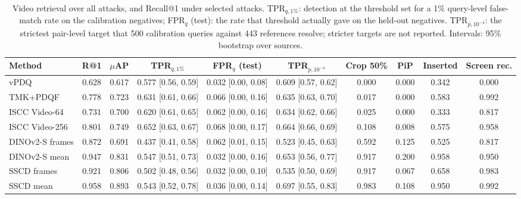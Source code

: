 \begin{table}[!t]
\centering
\scriptsize
\caption{Video retrieval over all attacks, and Recall@1 under selected attacks. TPR$_{q,1\%}$: detection at the threshold set for a 1\% query-level false-match rate on the calibration negatives; FPR$_q$ (test): the rate that threshold actually gave on the held-out negatives. TPR$_{p,10^{-4}}$: the strictest pair-level target that 500 calibration queries against 443 references resolve; stricter targets are not reported. Intervals: 95\% bootstrap over sources.}
\label{tab:video}
\setlength{\tabcolsep}{3pt}
\begin{tabular}{lccccccccc}
\toprule
Method & R@1 & $\mu$AP & TPR$_{q,1\%}$ & FPR$_{q}$ (test) & TPR$_{p,10^{-4}}$ & Crop 50\% & PiP & Inserted & Screen rec. \\
\midrule
vPDQ & 0.628 & 0.617 & 0.577 \tiny[0.56, 0.59] & 0.032 \tiny[0.00, 0.08] & 0.609 \tiny[0.57, 0.62] & 0.000 & 0.000 & 0.342 & 0.000 \\
TMK+PDQF & 0.778 & 0.723 & 0.631 \tiny[0.61, 0.66] & 0.066 \tiny[0.00, 0.16] & 0.635 \tiny[0.63, 0.70] & 0.017 & 0.000 & 0.583 & 0.992 \\
ISCC Video-64 & 0.731 & 0.700 & 0.620 \tiny[0.61, 0.65] & 0.062 \tiny[0.00, 0.16] & 0.634 \tiny[0.62, 0.66] & 0.025 & 0.000 & 0.333 & 0.817 \\
ISCC Video-256 & 0.801 & 0.749 & 0.652 \tiny[0.63, 0.67] & 0.068 \tiny[0.00, 0.17] & 0.664 \tiny[0.66, 0.69] & 0.108 & 0.008 & 0.575 & 0.958 \\
DINOv2-S frames & 0.872 & 0.691 & 0.437 \tiny[0.41, 0.58] & 0.062 \tiny[0.01, 0.15] & 0.523 \tiny[0.45, 0.63] & 0.592 & 0.125 & 0.525 & 0.817 \\
DINOv2-S mean & 0.947 & 0.831 & 0.547 \tiny[0.51, 0.73] & 0.032 \tiny[0.00, 0.16] & 0.653 \tiny[0.56, 0.77] & 0.917 & 0.200 & 0.958 & 0.950 \\
SSCD frames & 0.921 & 0.806 & 0.502 \tiny[0.48, 0.56] & 0.032 \tiny[0.00, 0.10] & 0.535 \tiny[0.50, 0.69] & 0.917 & 0.067 & 0.658 & 0.983 \\
SSCD mean & 0.958 & 0.893 & 0.543 \tiny[0.52, 0.78] & 0.036 \tiny[0.00, 0.14] & 0.697 \tiny[0.55, 0.83] & 0.983 & 0.108 & 0.950 & 0.992 \\
\bottomrule
\end{tabular}

\end{table}

